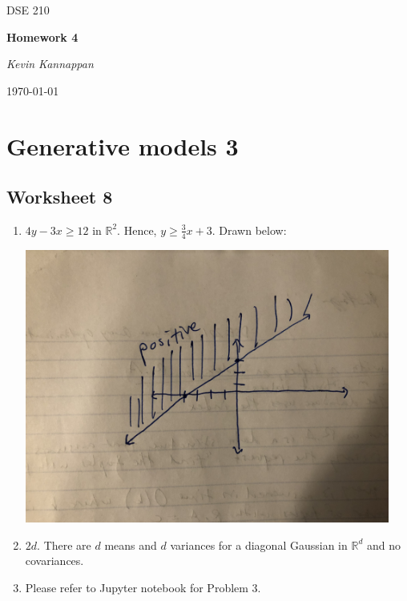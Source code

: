 \documentclass[12pt]{article}
\theoremstyle{plain}
\theoremstyle{definition}
\numberwithin{equation}{theorem}
\begin{document}
\begin{titlepage}
	\centering
	\vspace{4cm}
	{\scshape\Large DSE 210\par}
	\vspace{1.5cm}
	{\huge\bfseries Homework 4\par}
	\vspace{2cm}
	{\Large\itshape Kevin Kannappan\par}

	{\large \today\par}
\end{titlepage}


\section{Generative models 3}
\subsection{Worksheet 8}
\begin{enumerate}
\item $4y - 3x \geq 12$ in $\mathbb{R}^{2}$. Hence, $y \geq \frac{3}{4}x + 3$. Drawn below:
\bigskip
\begin{center}
\includegraphics[width=12cm, height=9cm]{ws_8_q1}
\end{center}
\bigskip
\item $2d$. There are $d$ means and $d$ variances for a diagonal Gaussian in $\mathbb{R}^{d}$ and no covariances.
\item Please refer to Jupyter notebook for Problem 3.
\end{enumerate}
\bigskip
\end{document}
